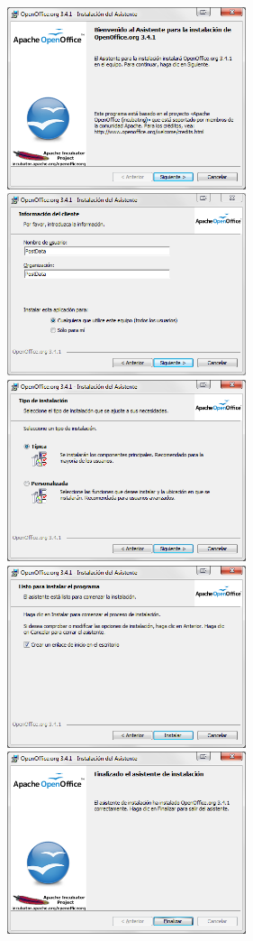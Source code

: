 \documentclass[10pt,a4paper]{article}
\begin{document}
    \begin{center}
    \includegraphics[width=7cm]{../fig/Tut00-WebOpenOffice-06.png}\hspace{1cm}\includegraphics[width=7cm]{../fig/Tut00-WebOpenOffice-07.png}\\[5mm]
    \includegraphics[width=7cm]{../fig/Tut00-WebOpenOffice-08.png}\hspace{1cm}\includegraphics[width=7cm]{../fig/Tut00-WebOpenOffice-09.png}\\[5mm]
    \includegraphics[width=7cm]{../fig/Tut00-WebOpenOffice-11.png}
    \end{center}
\end{document}
